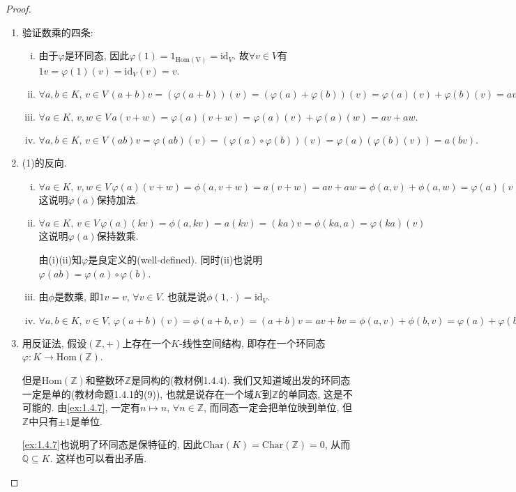\begin{proof}
\begin{enumerate}[(1)]
    \item 验证数乘的四条:
    \begin{enumerate}[(i)]
        \item 由于$\varphi$是环同态, 因此$\varphi(1) = 1_{\mathrm{Hom(V)}} = \mathrm{id}_V$. 故$\forall v \in V$有$1v = \varphi(1)(v) = \mathrm{id}_V(v) = v$.
        \item \(
            \forall a, b \in K,\, v \in V\, (a + b)v = (\varphi(a + b))(v) = (\varphi(a) + \varphi(b))(v) = \varphi(a)(v) + \varphi(b)(v) = av + bv.
        \)
        \item \(
            \forall a \in K,\, v, w \in V\, a(v + w) = \varphi(a)(v + w) = \varphi(a)(v) + \varphi(a)(w) = av + aw.
        \)
        \item \(
            \forall a, b \in K,\, v \in V\, (ab)v = \varphi(ab)(v) = (\varphi(a) \circ \varphi(b))(v) = \varphi(a)(\varphi(b)(v)) = a(bv).
        \)
    \end{enumerate}
    \item (1)的反向.
    \begin{enumerate}[(i)]
        \item \(
            \forall a \in K,\, v, w \in V\, \varphi(a)(v + w) = \phi(a, v + w) = a(v + w) = av + aw = \phi(a, v) + \phi(a, w) = \varphi(a)(v) + \varphi(a)(w)
        \)这说明$\varphi(a)$保持加法.
        \item \(
            \forall a \in K,\, v \in V\, \varphi(a)(kv) = \phi(a, kv) = a(kv) = (ka)v = \phi(ka, a) = \varphi(ka)(v)
        \)这说明$\varphi(a)$保持数乘.

        由(i)(ii)知$\varphi$是良定义的(well-defined). 同时(ii)也说明$\varphi(ab) = \varphi(a) \circ \varphi(b)$.
        \item 由$\phi$是数乘, 即$1v = v,\, \forall v \in V$. 也就是说$\phi(1, \cdot) = \mathrm{id}_V$.
        \item \(
            \forall a, b \in K,\, v \in V,\, \varphi(a + b)(v) = \phi(a + b, v) = (a + b)v = av + bv = \phi(a, v) + \phi(b, v) = \varphi(a) + \varphi(b)
        \)
    \end{enumerate}
    \item 用反证法, 假设$(\mathbb{Z}, +)$上存在一个$K$-线性空间结构, 即存在一个环同态$\varphi: K \to \mathrm{Hom}(\mathbb{Z})$.
    
    但是$\mathrm{Hom}(\mathbb{Z})$和整数环$\mathbb{Z}$是同构的(教材例1.4.4). 我们又知道域出发的环同态一定是单的(教材命题1.4.1的(9)), 也就是说存在一个域$K$到$\mathbb{Z}$的单同态, 这是不可能的.
    由\ref{ex:1.4.7}, 一定有$n \mapsto n,\, \forall n \in \mathbb{Z}$, 而同态一定会把单位映到单位, 但$\mathbb{Z}$中只有$\pm1$是单位.
    
    \ref{ex:1.4.7}也说明了环同态是保特征的, 因此$\mathrm{Char}(K) = \mathrm{Char}(\mathbb{Z}) = 0$, 从而$\mathbb{Q} \subseteq K$. 这样也可以看出矛盾.
\end{enumerate}
\end{proof}

